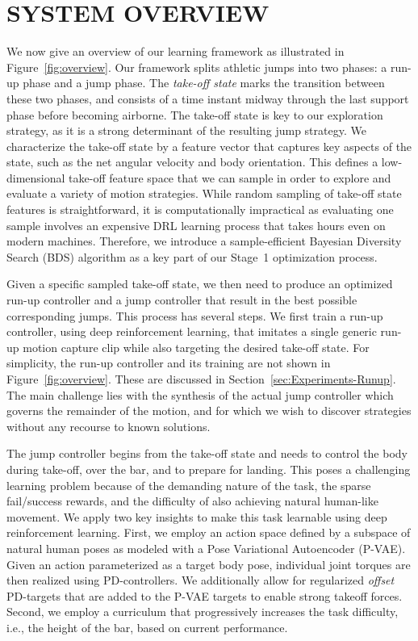 \section{SYSTEM OVERVIEW}


We now give an overview of our learning framework as illustrated in Figure~\ref{fig:overview}. Our framework splits athletic jumps into two phases: a run-up phase and a jump phase. The {\em take-off state} marks the transition between these two phases, and consists of a time instant midway through the last support phase before becoming airborne. The take-off state is key to our exploration strategy, as it is a strong determinant of the resulting jump strategy. We characterize the take-off state by a feature vector that captures key aspects of the state, such as the net angular velocity and body orientation. This defines a low-dimensional take-off feature space that we can sample in order to explore and evaluate a variety of motion strategies. While random sampling of take-off state features is straightforward, it is computationally impractical as evaluating one sample involves an expensive DRL learning process that takes hours even on modern machines. Therefore, we introduce a sample-efficient Bayesian Diversity Search (BDS) algorithm as a key part of our Stage~1 optimization process.

Given a specific sampled take-off state, we then need to produce an optimized run-up controller and a jump controller that result in the best possible corresponding jumps. This process has several steps. We first train a {\em }run-up controller, using deep reinforcement learning, that imitates a single generic run-up motion capture clip while also targeting the desired take-off state. For simplicity, the run-up controller and its training are not shown in Figure~\ref{fig:overview}. These are discussed in Section~\ref{sec:Experiments-Runup}. The main challenge lies with the synthesis of the actual jump controller which governs the remainder of the motion, and for which we wish to discover strategies without any recourse to known solutions.

The jump controller begins from the take-off state and needs to control the body during take-off, over the bar, and to prepare for landing. This poses a challenging learning problem because of the demanding nature of the task, the sparse fail/success rewards, and the difficulty of also achieving natural human-like movement. We apply two key insights to make this task learnable using deep reinforcement learning. First, we employ an action space defined by a subspace of natural human poses as modeled with a Pose Variational Autoencoder (P-VAE). Given an action parameterized as a target body pose, individual joint torques are then realized using PD-controllers. We additionally allow for regularized {\em offset} PD-targets that are added to the P-VAE targets to enable strong takeoff forces. Second, we employ a curriculum that progressively increases the task difficulty, i.e., the height of the bar, based on current performance.

